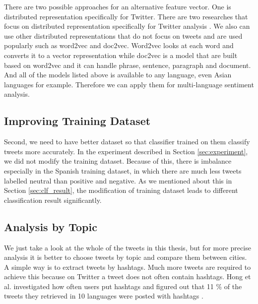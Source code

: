 There are two possible approaches for an alternative feature vector.
One is distributed representation specifically for Twitter.
There are two researches that focus on distributed representation specifically for Twitter analysis \cite{tweet2vec1} \cite{tweet2vec2}.
We also can use other distributed representations that do not focus on tweets and are used popularly such as word2vec and doc2vec.
Word2vec looks at each word and converts it to a vector representation while doc2vec is a model that are built based on word2vec and it can handle phrase, sentence, paragraph and document.
And all of the models listed above is available to any language, even Asian languages for example.
Therefore we can apply them for multi-language sentiment analysis.

\subsection{Improving Training Dataset}
Second, we need to have better dataset so that classifier trained on them classify tweets more accurately.
In the experiment described in Section \ref{sec:experiment}, we did not modify the training dataset.
Because of this, there is imbalance especially in the Spanish training dataset, in which there are much less tweets labelled neutral than positive and negative.
As we mentioned about this in Section \ref{sec:clf_result}, the modification of training dataset leads to different classification result significantly.



\subsection{Analysis by Topic}
We just take a look at the whole of the tweets in this thesis, but for more precise analysis it is better to choose tweets by topic and compare them between cities.
A simple way is to extract tweets by hashtags.
Much more tweets are required to achieve this because on Twitter a tweet does not often contain hashtags.
Hong et al. investigated how often users put hashtags and figured out that 11 \% of the tweets they retrieved in 10 languages were posted with hashtags \cite{hong}.
